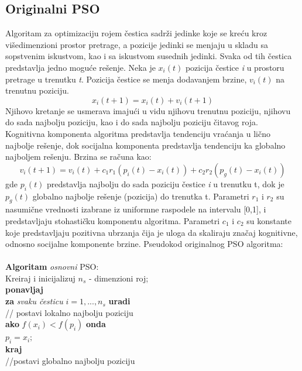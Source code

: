 \documentclass[a4paper]{article}
\begin{document}
\subsection{Originalni PSO}
Algoritam za optimizaciju rojem čestica sadrži jedinke koje se kreću kroz višedimenzioni prostor pretrage, a pozicije jedinki se menjaju u skladu sa sopstvenim iskustvom, kao i sa iskustvom susednih jedinki. Svaka od tih čestica predstavlja jedno moguće rešenje.
Neka je $x_i(t)$ pozicija čestice \textit{i} u prostoru pretrage u trenutku \textit{t}. Pozicija čestice se menja dodavanjem brzine, $v_i(t)$ na trenutnu poziciju. \[x_i(t+1) = x_i(t) + v_i(t+1) \]
Njihovo kretanje se usmerava imajući u vidu njihovu trenutnu poziciju, njihovu do sada najbolju poziciju, kao i do sada najbolju poziciju čitavog roja. Kognitivna komponenta algoritma predstavlja tendenciju vraćanja u lično najbolje rešenje, dok socijalna komponenta predstavlja tendenciju ka globalno najboljem rešenju. Brzina se računa kao: \[ v_i(t+1) = v_i(t) + c_1r_1(p_i(t) - x_i(t)) + c_2r_2(p_g(t) - x_i(t))\]
gde $p_i(t)$ predstavlja najbolju do sada poziciju čestice \textit{i} u trenutku t, dok je $p_g(t)$ globalno najbolje rešenje (pozicija) do trenutka t. Parametri $r_1$ i $r_2$ su nasumične vrednosti izabrane iz uniformne raspodele na intervalu [0,1], i predstavljaju stohastičku komponentu algoritma. Parametri $c_1$ i $c_2$ su konstante koje predstavljaju pozitivna ubrzanja čija je uloga da skaliraju značaj kognitivne, odnosno socijalne komponente brzine. 
Pseudokod originalnog PSO algoritma: \\ \\
\textbf{Algoritam} \textit{osnovni} PSO: \\ 
Kreiraj i inicijalizuj $n_s$ - dimenzioni roj;\\
\textbf{ponavljaj} \\ 
\hspace*{5mm}\textbf{za} \textit{svaku česticu} $\textit{i} = 1,...,n_s$ \textbf{uradi} \\
\hspace*{5mm} // postavi lokalno najbolju poziciju \\
\hspace*{10mm} \textbf{ako} $f(x_i) < f(p_i)$ \textbf{onda} \\
\hspace*{15mm} $p_i = x_i;$ \\
\hspace*{10mm} \textbf{kraj} \\
\hspace*{5mm}//postavi globalno najbolju poziciju \\\
\end{document}
